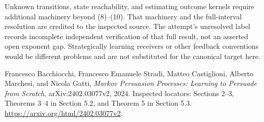 \documentclass[11pt]{article}
\begin{document}
Unknown transitions, state reachability, and estimating outcome kernels
require additional machinery beyond (8)--(10). That machinery and the
full-interval resolution are credited to the inspected source. The
attempt's unresolved label records incomplete independent verification
of that full result, not an asserted open exponent gap. Strategically
learning receivers or other feedback conventions would be different
problems and are not substituted for the canonical target here.

Francesco Bacchiocchi, Francesco Emanuele Stradi, Matteo Castiglioni,
Alberto Marchesi, and Nicola Gatti, \emph{Markov Persuasion Processes:
Learning to Persuade from Scratch}, arXiv:2402.03077v2, 2024.
Inspected locators: Sections 2--3, Theorems 3--4 in Section 5.2,
and Theorem 5 in Section 5.3.
\url{https://arxiv.org/html/2402.03077v2}.
\end{document}
